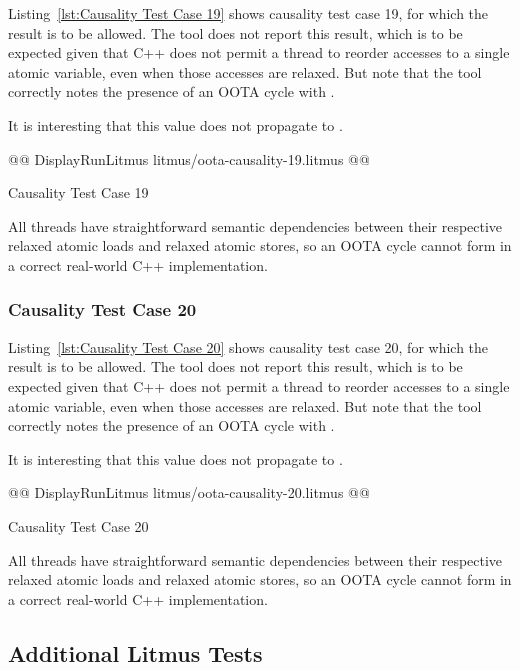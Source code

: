 \documentclass[10]{article}
\begin{document}
Listing~\ref{lst:Causality Test Case 19}
shows causality test case 19, for which the 
result is to be allowed.
The  tool does not report this result, which is to be expected
given that C++ does not permit a thread to reorder accesses to a single
atomic variable, even when those accesses are relaxed.
But note that the  tool correctly notes the presence of an
OOTA cycle with .

It is interesting that this  value does not propagate to
.

\begin{listing}[tbp]
@@ DisplayRunLitmus litmus/oota-causality-19.litmus @@
\caption{Causality Test Case 19}
\label{lst:Causality Test Case 19}
\end{listing}

All threads have straightforward semantic dependencies between their
respective relaxed atomic loads and relaxed atomic stores, so an OOTA
cycle cannot form in a correct real-world C++ implementation.

\subsubsection{Causality Test Case 20}
\label{app:Causality Test Case 20}

Listing~\ref{lst:Causality Test Case 20}
shows causality test case 20, for which the 
result is to be allowed.
The  tool does not report this result, which is to be expected
given that C++ does not permit a thread to reorder accesses to a single
atomic variable, even when those accesses are relaxed.
But note that the  tool correctly notes the presence of an
OOTA cycle with .

It is interesting that this  value does not propagate to
.

\begin{listing}[tbp]
@@ DisplayRunLitmus litmus/oota-causality-20.litmus @@
\caption{Causality Test Case 20}
\label{lst:Causality Test Case 20}
\end{listing}

All threads have straightforward semantic dependencies between their
respective relaxed atomic loads and relaxed atomic stores, so an OOTA
cycle cannot form in a correct real-world C++ implementation.

\subsection{Additional Litmus Tests}
\label{app:Additional Litmus Tests}
\end{document}
